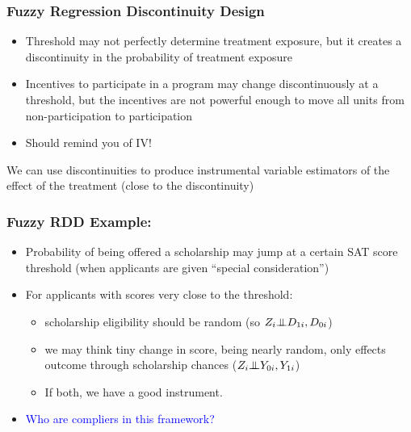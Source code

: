\documentclass[xcolor=dvipsnames]{beamer}
\newcommand{\indep}{{\bot\negthickspace\negthickspace\bot}}
\begin{document}
\begin{frame}
  \frametitle{Fuzzy Regression Discontinuity Design}
\begin{itemize}
\item<1-> Threshold may not perfectly determine treatment
exposure, but it creates a discontinuity in the probability of
treatment exposure\bigskip

\item<2-> Incentives to participate in a program may change discontinuously at a threshold, but the incentives are not powerful enough to move all units from non-participation to participation\bigskip
%
\item<3-> Should remind you of IV!
\end{itemize}
 We can use  discontinuities to produce instrumental variable estimators of the effect of the treatment (close to the discontinuity)
\end{frame}

\begin{frame}
  \frametitle{Fuzzy RDD Example:}
\small
\begin{itemize}
  \item<1-> Probability of being offered a scholarship may jump at a certain SAT score threshold (when applicants are given ``special consideration'')\bigskip
  \item<2-> For applicants with scores very close to the threshold:
  \begin{itemize}
  \item<3->  scholarship eligibility should be random (so $Z_i \indep D_{1i}, D_{0i}$)
  \smallskip
  \item<4-> we may think tiny change in score, being nearly random,  only effects outcome through scholarship chances ($Z_i \indep Y_{0i}, Y_{1i}$)
  \smallskip
  \item<5-> If both, we have a good instrument.
  \end{itemize}
  \bigskip
  \item<6-> \textcolor{Blue}{Who are compliers in this framework?} 
\end{itemize}
\end{frame}
\end{document}
